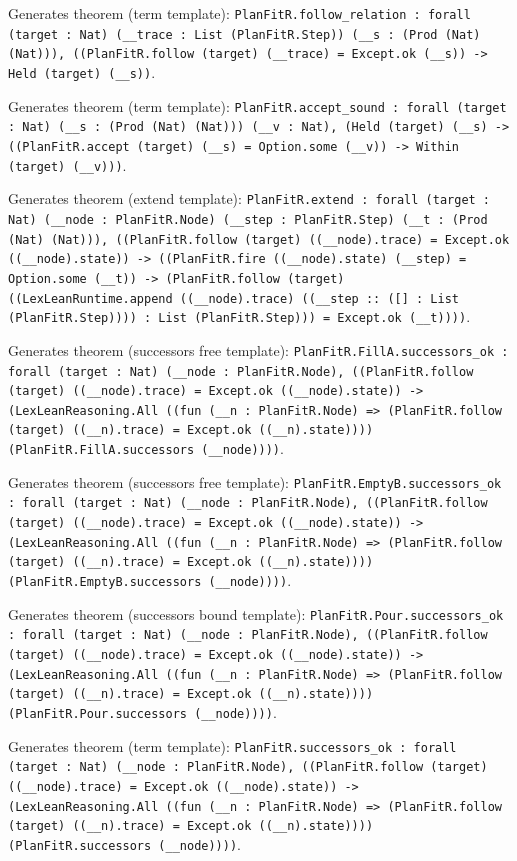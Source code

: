 \documentclass[11pt]{article}
\begin{document}
\noindent Generates theorem (term template): \texttt{PlanFitR.follow\_relation : forall (target : Nat) (\_\_trace : List (PlanFitR.Step)) (\_\_s : (Prod (Nat) (Nat))), ((PlanFitR.follow (target) (\_\_trace) = Except.ok (\_\_s)) -> Held (target) (\_\_s))}.\par
\noindent Generates theorem (term template): \texttt{PlanFitR.accept\_sound : forall (target : Nat) (\_\_s : (Prod (Nat) (Nat))) (\_\_v : Nat), (Held (target) (\_\_s) -> ((PlanFitR.accept (target) (\_\_s) = Option.some (\_\_v)) -> Within (target) (\_\_v)))}.\par
\noindent Generates theorem (extend template): \texttt{PlanFitR.extend : forall (target : Nat) (\_\_node : PlanFitR.Node) (\_\_step : PlanFitR.Step) (\_\_t : (Prod (Nat) (Nat))), ((PlanFitR.follow (target) ((\_\_node).trace) = Except.ok ((\_\_node).state)) -> ((PlanFitR.fire ((\_\_node).state) (\_\_step) = Option.some (\_\_t)) -> (PlanFitR.follow (target) ((LexLeanRuntime.append ((\_\_node).trace) ((\_\_step :: ([] : List (PlanFitR.Step)))) : List (PlanFitR.Step))) = Except.ok (\_\_t))))}.\par
\noindent Generates theorem (successors free template): \texttt{PlanFitR.FillA.successors\_ok : forall (target : Nat) (\_\_node : PlanFitR.Node), ((PlanFitR.follow (target) ((\_\_node).trace) = Except.ok ((\_\_node).state)) -> (LexLeanReasoning.All ((fun (\_\_n : PlanFitR.Node) => (PlanFitR.follow (target) ((\_\_n).trace) = Except.ok ((\_\_n).state)))) (PlanFitR.FillA.successors (\_\_node))))}.\par
\noindent Generates theorem (successors free template): \texttt{PlanFitR.EmptyB.successors\_ok : forall (target : Nat) (\_\_node : PlanFitR.Node), ((PlanFitR.follow (target) ((\_\_node).trace) = Except.ok ((\_\_node).state)) -> (LexLeanReasoning.All ((fun (\_\_n : PlanFitR.Node) => (PlanFitR.follow (target) ((\_\_n).trace) = Except.ok ((\_\_n).state)))) (PlanFitR.EmptyB.successors (\_\_node))))}.\par
\noindent Generates theorem (successors bound template): \texttt{PlanFitR.Pour.successors\_ok : forall (target : Nat) (\_\_node : PlanFitR.Node), ((PlanFitR.follow (target) ((\_\_node).trace) = Except.ok ((\_\_node).state)) -> (LexLeanReasoning.All ((fun (\_\_n : PlanFitR.Node) => (PlanFitR.follow (target) ((\_\_n).trace) = Except.ok ((\_\_n).state)))) (PlanFitR.Pour.successors (\_\_node))))}.\par
\noindent Generates theorem (term template): \texttt{PlanFitR.successors\_ok : forall (target : Nat) (\_\_node : PlanFitR.Node), ((PlanFitR.follow (target) ((\_\_node).trace) = Except.ok ((\_\_node).state)) -> (LexLeanReasoning.All ((fun (\_\_n : PlanFitR.Node) => (PlanFitR.follow (target) ((\_\_n).trace) = Except.ok ((\_\_n).state)))) (PlanFitR.successors (\_\_node))))}.\par
\end{document}
